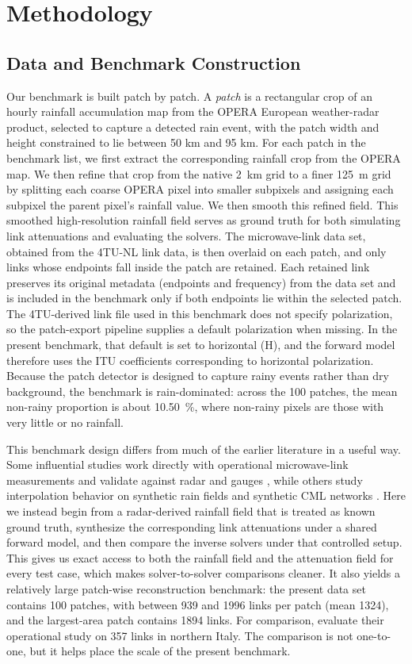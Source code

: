 \documentclass[11pt]{article}
\begin{document}
\section{Methodology}
\subsection{Data and Benchmark Construction}
Our benchmark is built patch by patch. A \emph{patch} is a rectangular crop of an hourly rainfall accumulation map from the OPERA European weather-radar product, selected to capture a detected rain event, with the patch width and height constrained to lie between 50 km and 95 km. For each patch in the benchmark list, we first extract the corresponding rainfall crop from the OPERA map. We then refine that crop from the native \SI{2}{km} grid to a finer \SI{125}{m} grid by splitting each coarse OPERA pixel into smaller subpixels and assigning each subpixel the parent pixel's rainfall value. We then smooth this refined field. This smoothed high-resolution rainfall field serves as ground truth for both simulating link attenuations and evaluating the solvers. The microwave-link data set, obtained from the 4TU-NL link data, is then overlaid on each patch, and only links whose endpoints fall inside the patch are retained. Each retained link preserves its original metadata (endpoints and frequency) from the data set and is included in the benchmark only if both endpoints lie within the selected patch. The 4TU-derived link file used in this benchmark does not specify polarization, so the patch-export pipeline supplies a default polarization when missing. In the present benchmark, that default is set to horizontal ($\mathrm{H}$), and the forward model therefore uses the ITU coefficients corresponding to horizontal polarization. Because the patch detector is designed to capture rainy events rather than dry background, the benchmark is rain-dominated: across the 100 patches, the mean non-rainy proportion is about \SI{10.50}{\percent}, where non-rainy pixels are those with very little or no rainfall.

This benchmark design differs from much of the earlier literature in a useful way. Some influential studies work directly with operational microwave-link measurements and validate against radar and gauges \citep{messer2006environmental,roversi2020northernitaly}, while others study interpolation behavior on synthetic rain fields and synthetic CML networks \citep{eshel2020idw}. Here we instead begin from a radar-derived rainfall field that is treated as known ground truth, synthesize the corresponding link attenuations under a shared forward model, and then compare the inverse solvers under that controlled setup. This gives us exact access to both the rainfall field and the attenuation field for every test case, which makes solver-to-solver comparisons cleaner. It also yields a relatively large patch-wise reconstruction benchmark: the present data set contains 100 patches, with between 939 and 1996 links per patch (mean 1324), and the largest-area patch contains 1894 links. For comparison, \citet{roversi2020northernitaly} evaluate their operational study on 357 links in northern Italy. The comparison is not one-to-one, but it helps place the scale of the present benchmark.
\end{document}
